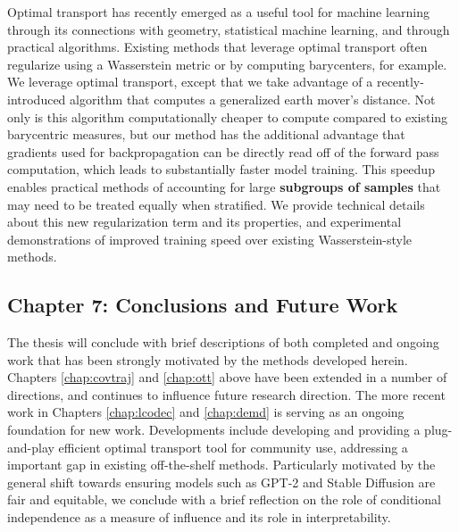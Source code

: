 Optimal transport has recently emerged as a useful tool 
for machine learning through its connections with geometry,
statistical machine learning, and through practical algorithms.
Existing methods that leverage optimal transport often  regularize using 
a Wasserstein metric or by computing barycenters, for example. %
We leverage optimal transport,
except that we take advantage of a recently-introduced algorithm
that computes a generalized earth mover's distance.
Not only is this algorithm computationally cheaper
to compute compared to existing barycentric measures,
but our method has the additional advantage that gradients used for backpropagation 
can be directly read off of the forward pass computation, which leads to substantially faster model training.
This speedup enables practical methods of accounting for large \textbf{subgroups of samples} that
may need to be treated equally when stratified.
We provide technical details about this new regularization term and its properties, 
and 
experimental demonstrations of improved training speed over existing Wasserstein-style methods.

\subsection{Chapter 7: Conclusions and Future Work}
The thesis will conclude
with brief descriptions of 
both completed and ongoing
work that has been strongly motivated
by the methods developed herein.
Chapters \ref{chap:covtraj} and \ref{chap:ott} above have been extended 
in a number of directions,
and continues to influence
future research direction. 
The more recent work in Chapters \ref{chap:lcodec} and \ref{chap:demd}
is serving as an ongoing foundation
for new work.
Developments include 
developing and providing a plug-and-play efficient optimal transport tool 
for community use,
addressing a important gap in existing off-the-shelf methods.
Particularly motivated by the general shift towards ensuring models such as GPT-2 and Stable Diffusion are fair and equitable,
we conclude with a brief reflection
on the role of conditional independence
as a measure of influence and its role in interpretability.

